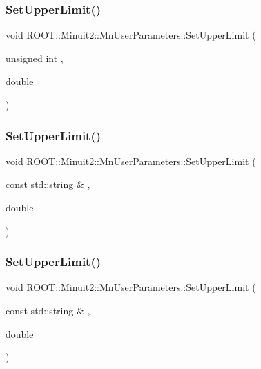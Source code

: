 \subsubsection{\texorpdfstring{SetUpperLimit()}{SetUpperLimit()}\hspace{0.1cm}{\footnotesize\ttfamily [3/6]}}
{\footnotesize\ttfamily void R\+O\+O\+T\+::\+Minuit2\+::\+Mn\+User\+Parameters\+::\+Set\+Upper\+Limit (\begin{DoxyParamCaption}\item[{unsigned int}]{,  }\item[{double}]{ }\end{DoxyParamCaption})}

\mbox{\label{classROOT_1_1Minuit2_1_1MnUserParameters_afc550532eeecdcb361f4c707032067e7}} 
\subsubsection{\texorpdfstring{SetUpperLimit()}{SetUpperLimit()}\hspace{0.1cm}{\footnotesize\ttfamily [4/6]}}
{\footnotesize\ttfamily void R\+O\+O\+T\+::\+Minuit2\+::\+Mn\+User\+Parameters\+::\+Set\+Upper\+Limit (\begin{DoxyParamCaption}\item[{const std\+::string \&}]{,  }\item[{double}]{ }\end{DoxyParamCaption})}

\mbox{\label{classROOT_1_1Minuit2_1_1MnUserParameters_afc550532eeecdcb361f4c707032067e7}} 
\subsubsection{\texorpdfstring{SetUpperLimit()}{SetUpperLimit()}\hspace{0.1cm}{\footnotesize\ttfamily [5/6]}}
{\footnotesize\ttfamily void R\+O\+O\+T\+::\+Minuit2\+::\+Mn\+User\+Parameters\+::\+Set\+Upper\+Limit (\begin{DoxyParamCaption}\item[{const std\+::string \&}]{,  }\item[{double}]{ }\end{DoxyParamCaption})}

